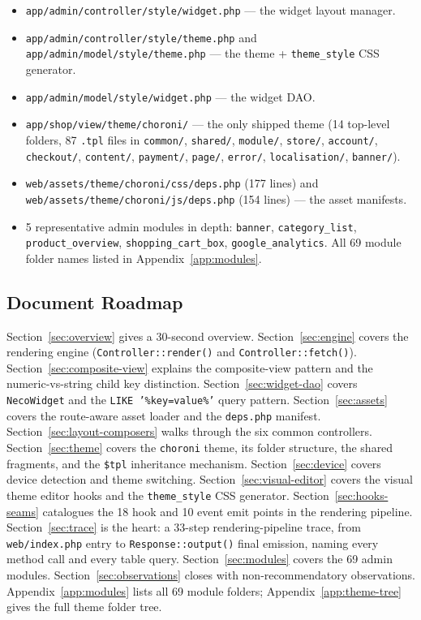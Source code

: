 \documentclass[11pt,a4paper]{article}
\begin{document}
\begin{itemize}[leftmargin=1.6em,itemsep=2pt]
        --- the admin widget config base.
  \item \texttt{app/admin/controller/style/widget.php} --- the
        widget layout manager.
  \item \texttt{app/admin/controller/style/theme.php} and
        \texttt{app/admin/model/style/theme.php} --- the theme +
        \texttt{theme\_style} CSS generator.
  \item \texttt{app/admin/model/style/widget.php} --- the widget
        DAO.
  \item \texttt{app/shop/view/theme/choroni/} --- the only shipped
        theme (14 top-level folders, 87 \texttt{.tpl} files in
        \texttt{common/}, \texttt{shared/}, \texttt{module/},
        \texttt{store/}, \texttt{account/}, \texttt{checkout/},
        \texttt{content/}, \texttt{payment/}, \texttt{page/},
        \texttt{error/}, \texttt{localisation/}, \texttt{banner/}).
  \item \texttt{web/assets/theme/choroni/css/deps.php} (177 lines)
        and \texttt{web/assets/theme/choroni/js/deps.php}
        (154 lines) --- the asset manifests.
  \item 5 representative admin modules in depth:
        \texttt{banner}, \texttt{category\_list},
        \texttt{product\_overview}, \texttt{shopping\_cart\_box},
        \texttt{google\_analytics}. All 69 module folder names listed
        in Appendix~\ref{app:modules}.
\end{itemize}

\subsection{Document Roadmap}

Section~\ref{sec:overview} gives a 30-second overview.
Section~\ref{sec:engine} covers the rendering engine
(\texttt{Controller::render()} and \texttt{Controller::fetch()}).
Section~\ref{sec:composite-view} explains the composite-view
pattern and the numeric-vs-string child key distinction.
Section~\ref{sec:widget-dao} covers \texttt{NecoWidget} and the
\texttt{LIKE '\%key=value\%'} query pattern.
Section~\ref{sec:assets} covers the route-aware asset loader and
the \texttt{deps.php} manifest.
Section~\ref{sec:layout-composers} walks through the six common
controllers.
Section~\ref{sec:theme} covers the \texttt{choroni} theme, its
folder structure, the shared fragments, and the \texttt{\$tpl}
inheritance mechanism.
Section~\ref{sec:device} covers device detection and theme
switching.
Section~\ref{sec:visual-editor} covers the visual theme editor
hooks and the \texttt{theme\_style} CSS generator.
Section~\ref{sec:hooks-seams} catalogues the 18 hook and 10 event
emit points in the rendering pipeline.
Section~\ref{sec:trace} is the heart: a 33-step rendering-pipeline
trace, from \texttt{web/index.php} entry to
\texttt{Response::output()} final emission, naming every method
call and every table query.
Section~\ref{sec:modules} covers the 69 admin modules.
Section~\ref{sec:observations} closes with non-recommendatory
observations. Appendix~\ref{app:modules} lists all 69 module
folders; Appendix~\ref{app:theme-tree} gives the full theme
folder tree.
\end{document}
